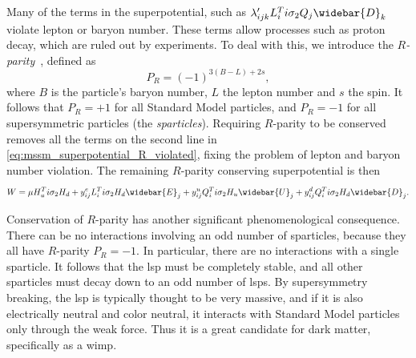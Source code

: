 Many of the terms in the superpotential, such as $\lambda_{ijk}' L_i^Ti\sigma_2Q_j\widebar{D}_k$ violate lepton or baryon number.
These terms allow processes such as proton decay, which are ruled out by experiments.
To deal with this, we introduce the \emph{$R$-parity}~\cite{Farrar:1978xj}, defined as
\begin{equation}
    P_R = (-1)^{3(B-L)+2s},
\end{equation}
where $B$ is the particle's baryon number, $L$ the lepton number and $s$ the spin.
It follows that $P_R=+1$ for all Standard Model particles, and $P_R=-1$ for all supersymmetric particles (the \emph{sparticles}).
Requiring $R$-parity to be conserved removes all the terms on the second line in \cref{eq:mssm_superpotential_R_violated}, fixing the problem of lepton and baryon number violation.
The remaining $R$-parity conserving superpotential is then
\begin{equation}\label{eq:mssm_superpotential}
    W = \mu H_u^Ti\sigma_2H_d + y_{ij}^e L_i^Ti\sigma_2H_d\widebar{E}_j + y_{ij}^u Q_i^Ti\sigma_2H_u\widebar{U}_j + y_{ij}^d Q_i^Ti\sigma_2H_d\widebar{D}_j.
\end{equation}

Conservation of $R$-parity has another significant phenomenological consequence.
There can be no interactions involving an odd number of sparticles, because they all have $R$-parity $P_R=-1$. In particular, there are no interactions with a single sparticle.
It follows that the \gls{lsp} must be completely stable, and all other sparticles must decay down to an odd number of \glspl{lsp}.
By supersymmetry breaking, the \gls{lsp} is typically thought to be very massive, and if it is also electrically neutral and color neutral, it interacts with Standard Model particles only through the weak force.
Thus it is a great candidate for dark matter, specifically as a \gls{wimp}.


